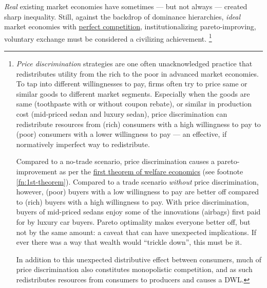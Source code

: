 \emph{Real} existing market economies have sometimes --- but not always --- created sharp inequality.
Still, against the backdrop of dominance hierarchies, \emph{ideal} market economies with \hyperref[fn:perfect-competition]{perfect competition}, institutionalizing pareto-improving, voluntary exchange must be considered a civilizing achievement.
\footnote{
	\emph{Price discrimination} strategies are one often unacknowledged practice that redistributes utility from the rich to the poor in advanced market economies.
	To tap into different willingnesses to pay, firms often try to price same or similar goods to different market segments.
	Especially when the goods are same (toothpaste with or without coupon rebate), or similar in production cost (mid-priced sedan and luxury sedan), price discrimination can redistribute resources from (rich) consumers with a high willingness to pay to (poor) consumers with a lower willingness to pay --- an effective, if normatively imperfect way to redistribute.

	Compared to a no-trade scenario, price discrimination causes a pareto-improvement as per the \hyperref[fn:1st-theorem]{first theorem of welfare economics} (see footnote \ref{fn:1st-theorem}).
	Compared to a trade scenario \emph{without} price discrimination, however, (poor) buyers with a low willingness to pay are better off compared to (rich) buyers with a high willingness to pay.
	With price discrimination, buyers of mid-priced sedans enjoy some of the innovations (airbags) first paid for by luxury car buyers.
	Pareto optimality makes everyone better off, but not by the same amount:
	a caveat that can have unexpected implications.
	If ever there was a way that wealth would ``trickle down'', this must be it.

	In addition to this unexpected distributive effect between consumers, much of price discrimination also constitutes monopolistic competition, and as such redistributes resources from consumers to producers and causes a \gls{DWL}.
}

